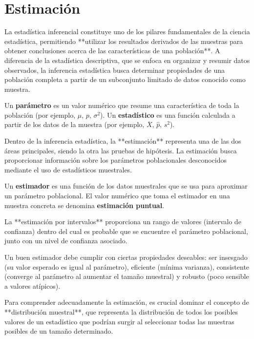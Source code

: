\chapter{Estimación}

La estadística inferencial constituye uno de los pilares fundamentales de la ciencia estadística, permitiendo **utilizar los resultados derivados de las muestras para obtener conclusiones acerca de las características de una población**. A diferencia de la estadística descriptiva, que se enfoca en organizar y resumir datos observados, la inferencia estadística busca determinar propiedades de una población completa a partir de un subconjunto limitado de datos conocido como muestra.

\begin{definition}
Un \textbf{parámetro} es un valor numérico que resume una característica de toda la población (por ejemplo, $\mu$, $p$, $\sigma^2$). Un \textbf{estadístico} es una función calculada a partir de los datos de la muestra (por ejemplo, $\overline{X}$, $\hat{p}$, $s^2$).
\end{definition}

Dentro de la inferencia estadística, la **estimación** representa una de las dos áreas principales, siendo la otra las pruebas de hipótesis. La estimación busca proporcionar información sobre los parámetros poblacionales desconocidos mediante el uso de estadísticos muestrales.

\begin{definition}
Un \textbf{estimador} es una función de los datos muestrales que se usa para aproximar un parámetro poblacional. El valor numérico que toma el estimador en una muestra concreta se denomina \textbf{estimación puntual}. 

La **estimación por intervalos** proporciona un rango de valores (intervalo de confianza) dentro del cual es probable que se encuentre el parámetro poblacional, junto con un nivel de confianza asociado.
\end{definition}

\begin{remark}
Un buen estimador debe cumplir con ciertas propiedades deseables: ser insesgado (su valor esperado es igual al parámetro), eficiente (mínima varianza), consistente (converge al parámetro al aumentar el tamaño muestral) y robusto (poco sensible a valores atípicos).
\end{remark}

Para comprender adecuadamente la estimación, es crucial dominar el concepto de **distribución muestral**, que representa la distribución de todos los posibles valores de un estadístico que podrían surgir al seleccionar todas las muestras posibles de un tamaño determinado.

